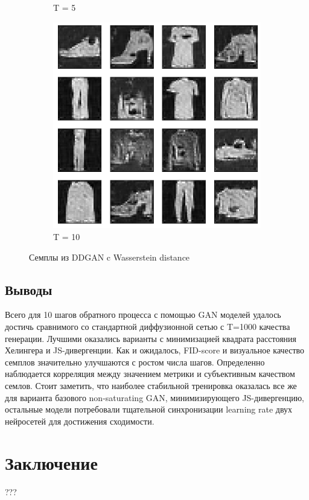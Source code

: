 \documentclass{article}
\begin{document}
\begin{figure}[H]
\begin{subfigure}[h]{0.3\linewidth}
		\caption{T = 5}
	\end{subfigure}
	\hfill
	\begin{subfigure}[h]{0.3\linewidth}
		\centering
		\includegraphics[scale=0.3]{../code/generated_DDGAN_wd_10.png}
		\caption{T = 10}
	\end{subfigure}
	\caption{Семплы из DDGAN c Wasserstein distance}\label{ddgan_wd_samples}	
\end{figure}

\subsection{Выводы}
Всего для 10 шагов обратного процесса с помощью GAN моделей удалось достичь сравнимого со стандартной диффузионной сетью с T=1000 качества генерации. Лучшими оказались варианты с минимизацией квадрата расстояния Хелингера и JS-дивергенции. Как и ожидалось, FID-score и визуальное качество семплов значительно улучшаются с ростом числа шагов. Определенно наблюдается корреляция между значением метрики и субъективным качеством семлов. Стоит заметить, что наиболее стабильной тренировка оказалась все же для варианта базового non-saturating GAN, минимизирующего JS-дивергенцию, остальные модели потребовали тщательной синхронизации learning rate двух нейросетей для достижения сходимости.


\section{Заключение}
???




\end{document}

